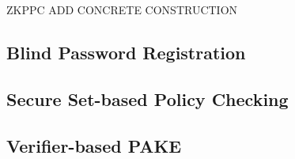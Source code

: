 \documentclass[notes,xcolor=dvipsnames]{beamer}
\begin{document}
\begin{frame}{ZKPPC}
  \alert{ADD CONCRETE CONSTRUCTION}
\end{frame}

\subsection[BPR]{Blind Password Registration}

\subsection[SPC]{Secure Set-based Policy Checking}

\subsection[VPAKE]{Verifier-based PAKE}
\end{document}
